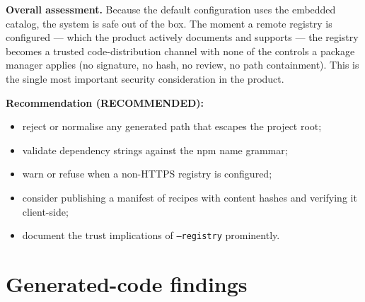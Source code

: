 \textbf{Overall assessment.} Because the default configuration uses the embedded
catalog, the system is safe out of the box. The moment a remote registry is
configured --- which the product actively documents and supports --- the registry
becomes a trusted code-distribution channel with none of the controls a package
manager applies (no signature, no hash, no review, no path containment). This is
the single most important security consideration in the product.

\textbf{Recommendation (RECOMMENDED):}
\begin{itemize}
  \item reject or normalise any generated path that escapes the project root;
  \item validate dependency strings against the npm name grammar;
  \item warn or refuse when a non-HTTPS registry is configured;
  \item consider publishing a manifest of recipes with content hashes and
        verifying it client-side;
  \item document the trust implications of \texttt{--registry} prominently.
\end{itemize}

\section{Generated-code findings}

